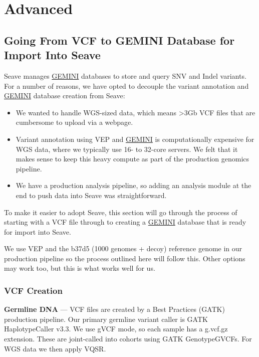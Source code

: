 \documentclass[11pt, a4paper]{article}
\newcommand{\GEMINI}{\href{https://gemini.readthedocs.io}{GEMINI} } %
\begin{document}

\section{Advanced}


\subsection{Going From VCF to GEMINI Database for Import Into Seave}

Seave manages \GEMINI databases to store and query SNV and Indel variants. For a number of reasons, we have opted to decouple the variant annotation and \GEMINI database creation from Seave:

\begin{itemize}
	\item We wanted to handle WGS-sized data, which means >3Gb VCF files that are cumbersome to upload via a webpage.
	\item Variant annotation using VEP and \GEMINI is computationally expensive for WGS data, where we typically use 16- to 32-core servers. We felt that it makes sense to keep this heavy compute as part of the production genomics pipeline.
	\item We have a production analysis pipeline, so adding an analysis module at the end to push data into Seave was straightforward.
\end{itemize}

To make it easier to adopt Seave, this section will go through the process of starting with a VCF file through to creating a \GEMINI database that is ready for import into Seave.

We use VEP and the b37d5 (1000 genomes + decoy) reference genome in our production pipeline so the process outlined here will follow this. Other options may work too, but this is what works well for us.

\subsubsection{VCF Creation}

\textbf{Germline DNA} --- VCF files are created by a Best Practices (GATK) production pipeline. Our primary germline variant caller is GATK HaplotypeCaller v3.3. We use gVCF mode, so each sample has a g.vcf.gz extension. These are joint-called into cohorts using GATK GenotypeGVCFs. For WGS data we then apply VQSR.
\end{document}

